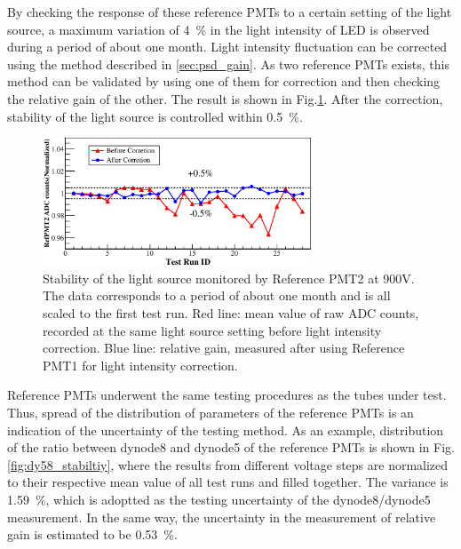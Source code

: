 \documentclass[review, times]{elsarticle}
\begin{document}
By checking the response of these reference PMTs to a certain setting of the light source, a maximum variation of \SI{4}{\percent} in the light intensity of LED is observed during a period of about one month.
Light intensity fluctuation can be corrected using the method described in \ref{sec:psd_gain}.
As two reference PMTs exists, this method can be validated by using one of them for correction and then checking the relative gain of the other. 
The result is shown in Fig.\ref{fig:led_stability}.
After the correction, stability of the light source is controlled within \textpm\SI{0.5}{\percent}.

\begin{figure}
 \centering
 \includegraphics[width=80mm]{led_stability}
\caption{Stability of the light source monitored by Reference PMT2 at 900V.
The data corresponds to a period of about one month and is all scaled to the first test run.
Red line: mean value of raw ADC counts, recorded at the same light source setting before light intensity correction.
Blue line: relative gain, measured after using Reference PMT1 for light intensity correction.}
\label{fig:led_stability}
\end{figure} 

Reference PMTs underwent the same testing procedures as the tubes under test.
Thus, spread of the distribution of parameters of the reference PMTs is an indication of the uncertainty of the testing method.
As an example, distribution of the ratio between dynode8 and dynode5 of the reference PMTs is shown in Fig.\ref{fig:dy58_stabiltiy}, where the results from different voltage steps are normalized to their respective mean value of all test runs and filled together.
The variance is \SI{1.59}{\percent}, which is adoptted as the testing uncertainty of the dynode8/dynode5 measurement.
In the same way, the uncertainty in the measurement of relative gain is estimated to be \SI{0.53}{\percent}. 
\end{document}
